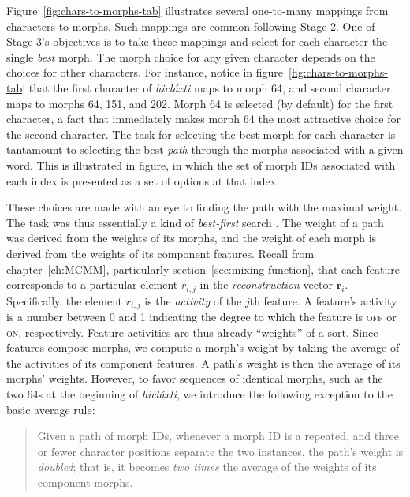 Figure~\ref{fig:chars-to-morphs-tab} illustrates several one-to-many mappings from 
characters to morphs. Such mappings are common following Stage 2. 
One of Stage 3's objectives is to take these mappings and select for each character the single 
\emph{best} morph. The morph choice for any given character depends on the choices 
for other characters. For instance, notice in figure~\ref{fig:chars-to-morphs-tab} that the first 
character of \textit{hicl\'{a}xti} maps to morph 64, and second character maps to 
morphs  64, 151, and 202. Morph 64 is selected (by default) for the first character, 
a fact that immediately makes morph 64 the most attractive choice for the second character.
The task for selecting the best morph for each character is tantamount to selecting the 
best \emph{path} through the morphs associated with a given word. 
This is illustrated in figure, in which the set of morph IDs associated with 
each index is presented as a set of options at that index.

These choices are made with an eye to finding the path with the maximal weight. The task 
was thus essentially a kind of
\emph{best-first} search \citep{pearl:1984}. The weight of a path was derived from
 the weights of its morphs, and the weight of each morph is derived from the weights of its component features. 
Recall from chapter~\ref{ch:MCMM}, particularly section~\ref{sec:mixing-function}, that each feature corresponds 
to a particular element $r_{i,j}$ in the \emph{reconstruction} 
vector $\mathbf{r}_{i}$. Specifically, the element $r_{i,j}$ is the \emph{activity} 
of the $j$th feature. A feature's activity is a number between 0 and 1 indicating the degree to 
which the feature is \textsc{off} or \textsc{on}, respectively. Feature activities 
are thus already ``weights'' of a sort. Since features compose morphs, we compute 
a morph's weight by taking the average of the activities of its component features. 
A path's weight is then the average of its morphs' weights. However, to favor 
sequences of identical morphs, such as the two 64s at the beginning of \textit{hicl\'{a}xti}, 
we introduce the following exception to the basic average rule: 
\begin{quote}\noindent
Given a path of morph IDs, 
whenever a morph ID is a repeated, and three or fewer character positions 
separate the two instances, the path's weight is \emph{doubled}; that is, 
it becomes \emph{two times} the average of the weights of its component morphs.
\end{quote}

